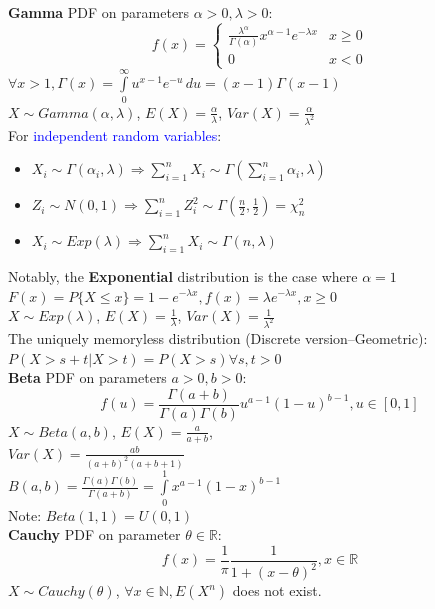 \textbf{Gamma} PDF on parameters $\alpha>0,\lambda>0$:
\[f(x)=\begin{cases}
  \frac{\lambda^\alpha}{\Gamma(\alpha)}x^{\alpha-1}e^{-\lambda x} & x\ge0\\
  0 & x<0
\end{cases}\]
$\forall x>1, \Gamma(x)=\int\limits_{0}^{\infty}u^{x-1}e^{-u}\,du=(x-1)\Gamma(x-1)$\\
$X\sim Gamma(\alpha, \lambda)$, $E(X)=\frac{\alpha}{\lambda}$, $Var(X)=\frac{\alpha}{\lambda^2}$\\
For \textcolor{Blue}{independent random variables}:
\begin{itemize}[noitemsep, topsep=-\parskip] 
  \item $X_i\sim\Gamma(\alpha_i,\lambda)\Rightarrow\sum\limits_{i=1}^{n}X_i\sim\Gamma(\sum\limits_{i=1}^{n}\alpha_i,\lambda)$
  \item $Z_i\sim N(0,1)\Rightarrow\sum\limits_{i=1}^{n}Z_{i}^{2}\sim
    \Gamma(\frac{n}{2},\frac{1}{2})=\chi_{n}^{2}$
  \item $X_i\sim
    Exp(\lambda)\Rightarrow\sum\limits_{i=1}^{n}X_i\sim\Gamma(n,\lambda)$
\end{itemize}
\textcolor{Bittersweet}{Notably}, the \textbf{Exponential} distribution is the
case where $\alpha=1$
$F(x) = P\{X\le x\} = 1-e^{-\lambda x}, f(x) = \lambda e^{-\lambda x}, x\ge0$\\
$X\sim Exp(\lambda)$, $E(X)=\frac{1}{\lambda}$, $Var(X)=\frac{1}{\lambda^2}$\\
The uniquely memoryless distribution (Discrete version–Geometric):
$P(X>s+t|X>t)=P(X>s) \forall s,t>0$\\
\textbf{Beta} PDF on parameters $a>0, b>0$:
\[f(u)=\frac{\Gamma(a+b)}{\Gamma(a)\Gamma(b)}u^{a-1}{(1-u)}^{b-1}, u\in[0,1]\]
$X\sim Beta(a,b)$, $E(X)=\frac{a}{a+b}$,\\
$Var(X)=\frac{ab}{{(a+b)}^{2}(a+b+1)}$\\
$B(a,b)=\frac{\Gamma(a)\Gamma(b)}{\Gamma(a+b)}=\int\limits_{0}^{1}x^{a-1}{(1-x)}^{b-1}$\\
\textcolor{Bittersweet}{Note}: $Beta(1,1)=U(0,1)$\\
\textbf{Cauchy} PDF on parameter $\theta\in\mathbb{R}$:
\[f(x)=\frac{1}{\pi}\frac{1}{1+{(x-\theta)}^{2}}, x\in\mathbb{R}\]
$X\sim Cauchy(\theta)$, $\forall x\in\mathbb{N}, E(X^n)$ does not exist.
